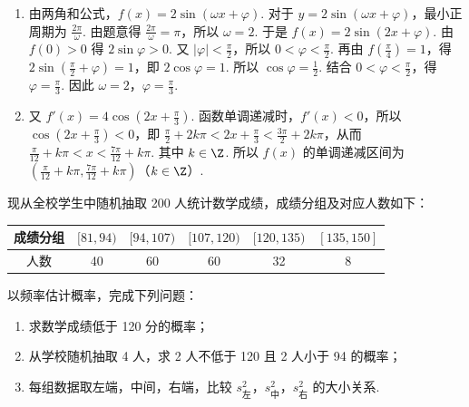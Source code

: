 \documentclass[UTF8,a4paper,oneside,11pt]{ctexbook}
\begin{document}
\begin{solution}
\begin{enumerate}
\item 由两角和公式，\( f(x)=2\sin\left( \omega x+\varphi \right) \). 对于 \( y=2\sin\left( \omega x+\varphi \right) \)，最小正周期为 \( \frac{2\pi}{\omega} \). 由题意得 \( \frac{2\pi}{\omega}=\pi \)，所以 \( \omega=2 \). 于是 \( f(x)=2\sin\left( 2x+\varphi \right) \). 由 \( f(0)>0 \) 得 \( 2\sin \varphi>0 \). 又 \( \left| \varphi \right|<\frac{\pi}{2} \)，所以 \( 0<\varphi<\frac{\pi}{2} \). 再由 \( f\left( \frac{\pi}{4} \right)=1 \)，得 \( 2\sin\left( \frac{\pi}{2}+\varphi \right)=1 \)，即 \( 2\cos \varphi=1 \). 所以 \( \cos \varphi=\frac{1}{2} \). 结合 \( 0<\varphi<\frac{\pi}{2} \)，得 \( \varphi=\frac{\pi}{3} \). 因此 \( \omega=2 \)，\( \varphi=\frac{\pi}{3} \).
\item 又 \( f'(x)=4\cos\left( 2x+\frac{\pi}{3} \right) \). 函数单调递减时，\( f'(x)<0 \)，所以 \( \cos\left( 2x+\frac{\pi}{3} \right)<0 \)，即 \( \frac{\pi}{2}+2k\pi<2x+\frac{\pi}{3}<\frac{3\pi}{2}+2k\pi \)，从而 \( \frac{\pi}{12}+k\pi<x<\frac{7\pi}{12}+k\pi \).
其中 \( k\in\Z \). 所以 \( f(x) \) 的单调递减区间为 \( \left( \frac{\pi}{12}+k\pi,\frac{7\pi}{12}+k\pi \right) \)（\( k\in\Z \)）.
\end{enumerate}
\end{solution}

\begin{problem}
现从全校学生中随机抽取 200 人统计数学成绩，成绩分组及对应人数如下：

\begin{center}
\renewcommand{\arraystretch}{1.35}
\begin{tabular}{|c|c|c|c|c|c|}
\hline
成绩分组 & {\([81,94)\)} & {\([94,107)\)} & {\([107,120)\)} & {\([120,135)\)} & {\([135,150]\)} \\
\hline
人数 & 40 & 60 & 60 & 32 & 8 \\
\hline
\end{tabular}
\end{center}

以频率估计概率，完成下列问题：

\begin{enumerate}
\item 求数学成绩低于 120 分的概率；
\item 从学校随机抽取 4 人，求 2 人不低于 120 且 2 人小于 94 的概率；
\item 每组数据取左端，中间，右端，比较 \( s_{\text{左}}^2 \)，\( s_{\text{中}}^2 \)，\( s_{\text{右}}^2 \) 的大小关系.
\end{enumerate}
\end{problem}
\end{document}
